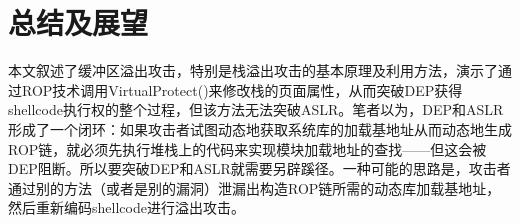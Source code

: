 \documentclass[bachelor]{thesis-uestc}
\begin{document}
\chapter{总结及展望}
本文叙述了缓冲区溢出攻击，特别是栈溢出攻击的基本原理及利用方法，演示了通过ROP技术调用VirtualProtect()来修改栈的页面属性，从而突破DEP获得shellcode执行权的整个过程，但该方法无法突破ASLR。笔者以为，DEP和ASLR形成了一个闭环：如果攻击者试图动态地获取系统库的加载基地址从而动态地生成ROP链，就必须先执行堆栈上的代码来实现模块加载地址的查找——但这会被DEP阻断。所以要突破DEP和ASLR就需要另辟蹊径。一种可能的思路是，攻击者通过别的方法（或者是别的漏洞）泄漏出构造ROP链所需的动态库加载基地址，然后重新编码shellcode进行溢出攻击。
\end{document}
